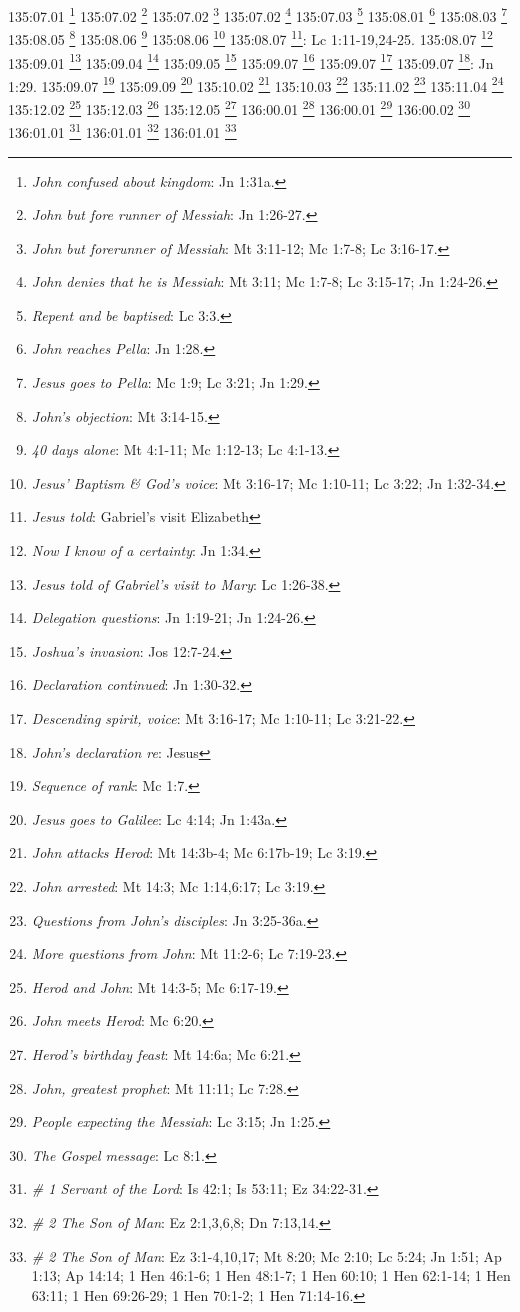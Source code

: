 {{{{{{{{{{{{{{{{{{{{{{{{{{{{{{{{{135:07.01 \footnote{\textit{John confused about kingdom}: Jn 1:31a.}
135:07.02 \footnote{\textit{John but fore runner of Messiah}: Jn 1:26-27.}
135:07.02 \footnote{\textit{John but forerunner of Messiah}: Mt 3:11-12; Mc 1:7-8; Lc 3:16-17.}
135:07.02 \footnote{\textit{John denies that he is Messiah}: Mt 3:11; Mc 1:7-8; Lc 3:15-17; Jn 1:24-26.}
135:07.03 \footnote{\textit{Repent and be baptised}: Lc 3:3.}
135:08.01 \footnote{\textit{John reaches Pella}: Jn 1:28.}
135:08.03 \footnote{\textit{Jesus goes to Pella}: Mc 1:9; Lc 3:21; Jn 1:29.}
135:08.05 \footnote{\textit{John's objection}: Mt 3:14-15.}
135:08.06 \footnote{\textit{40 days alone}: Mt 4:1-11; Mc 1:12-13; Lc 4:1-13.}
135:08.06 \footnote{\textit{Jesus' Baptism & God's voice}: Mt 3:16-17; Mc 1:10-11; Lc 3:22; Jn 1:32-34.}
135:08.07 \footnote{\textit{Jesus told}: Gabriel's visit Elizabeth}: Lc 1:11-19,24-25.}
135:08.07 \footnote{\textit{Now I know of a certainty}: Jn 1:34.}
135:09.01 \footnote{\textit{Jesus told of Gabriel's visit to Mary}: Lc 1:26-38.}
135:09.04 \footnote{\textit{Delegation questions}: Jn 1:19-21; Jn 1:24-26.}
135:09.05 \footnote{\textit{Joshua's invasion}: Jos 12:7-24.}
135:09.07 \footnote{\textit{Declaration continued}: Jn 1:30-32.}
135:09.07 \footnote{\textit{Descending spirit, voice}: Mt 3:16-17; Mc 1:10-11; Lc 3:21-22.}
135:09.07 \footnote{\textit{John's declaration re}: Jesus}: Jn 1:29.}
135:09.07 \footnote{\textit{Sequence of rank}: Mc 1:7.}
135:09.09 \footnote{\textit{Jesus goes to Galilee}: Lc 4:14; Jn 1:43a.}
135:10.02 \footnote{\textit{John attacks Herod}: Mt 14:3b-4; Mc 6:17b-19; Lc 3:19.}
135:10.03 \footnote{\textit{John arrested}: Mt 14:3; Mc 1:14,6:17; Lc 3:19.}
135:11.02 \footnote{\textit{Questions from John's disciples}: Jn 3:25-36a.}
135:11.04 \footnote{\textit{More questions from John}: Mt 11:2-6; Lc 7:19-23.}
135:12.02 \footnote{\textit{Herod and John}: Mt 14:3-5; Mc 6:17-19.}
135:12.03 \footnote{\textit{John meets Herod}: Mc 6:20.}
135:12.05 \footnote{\textit{Herod's birthday feast}: Mt 14:6a; Mc 6:21.}
136:00.01 \footnote{\textit{John, greatest prophet}: Mt 11:11; Lc 7:28.}
136:00.01 \footnote{\textit{People expecting the Messiah}: Lc 3:15; Jn 1:25.}
136:00.02 \footnote{\textit{The Gospel message}: Lc 8:1.}
136:01.01 \footnote{\textit{# 1 Servant of the Lord}: Is 42:1; Is 53:11; Ez 34:22-31.}
136:01.01 \footnote{\textit{# 2 The Son of Man}: Ez 2:1,3,6,8; Dn 7:13,14.}
136:01.01 \footnote{\textit{# 2 The Son of Man}: Ez 3:1-4,10,17; Mt 8:20; Mc 2:10; Lc 5:24; Jn 1:51; Ap 1:13; Ap 14:14; 1 Hen 46:1-6; 1 Hen 48:1-7; 1 Hen 60:10; 1 Hen 62:1-14; 1 Hen 63:11; 1 Hen 69:26-29; 1 Hen 70:1-2; 1 Hen 71:14-16.}
}}}}}}}}}}}}}}}}}}}}}}}}}}}}}}}
